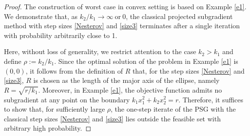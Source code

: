 \documentclass[10pt,a4paper]{amsart}
\begin{document}
\begin{proof}
	The construction of worst case in convex setting is based on Example \ref{e1}. We demonstrate that, as $k_2/k_1 \to \infty ~\text{or}~ 0$, the classical projected subgradient method with step sizes \eqref{Nesterov} and \eqref{size3} terminates after a single iteration with probability arbitrarily close to 1.
	
	Here, without loss of generality, we restrict attention to the case $k_2 > k_1$ and define $\rho := k_2 / k_1$. Since the optimal solution of the problem in Example \ref{e1} is $(0,0)$, it follows from the definition of $R$ that, for the step sizes \eqref{Nesterov} and \eqref{size3}, $R$ is chosen as the length of the major axis of the ellipse, namely $R = \sqrt{r/k_1}$. Moreover, in Example \ref{e1}, the objective function admits no subgradient at any point on the boundary $k_1 x_1^2 + k_2 x_2^2 = r$. Therefore, it suffices to show that, for sufficiently large $\rho$, the one-step iterate of the PSG with the classical step sizes \eqref{Nesterov} and \eqref{size3} lies outside the feasible set with arbitrary high probability.
	

\end{proof}
\end{document}
